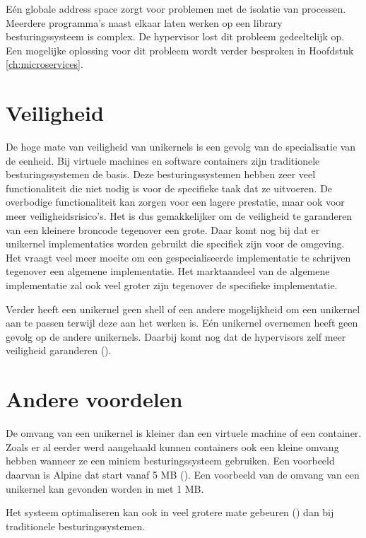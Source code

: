 Eén globale address space zorgt voor problemen met de isolatie van processen. Meerdere programma's naast elkaar laten werken op een library besturingssysteem is complex. De hypervisor lost dit probleem gedeeltelijk op. Een mogelijke oplossing voor dit probleem wordt verder besproken in Hoofdstuk \ref{ch:microservices}.

\section{Veiligheid}

De hoge mate van veiligheid van unikernels is een gevolg van de specialisatie van de eenheid. Bij virtuele machines en software containers zijn traditionele besturingssystemen de basis. Deze besturingssystemen hebben zeer veel functionaliteit die niet nodig is voor de specifieke taak dat ze uitvoeren. De overbodige functionaliteit kan zorgen voor een lagere prestatie, maar ook voor meer veiligheidsrisico's. Het is dus gemakkelijker om de veiligheid te garanderen van een kleinere broncode tegenover een grote. Daar komt nog bij dat er unikernel implementaties worden gebruikt die specifiek zijn voor de omgeving. Het vraagt veel meer moeite om een gespecialiseerde implementatie te schrijven tegenover een algemene implementatie. Het marktaandeel van de algemene implementatie zal ook veel groter zijn tegenover de specifieke implementatie.

Verder heeft een unikernel geen shell of een andere mogelijkheid om een unikernel aan te passen terwijl deze aan het werken is. Eén unikernel overnemen heeft geen gevolg op de andere unikernels. Daarbij komt nog dat de hypervisors zelf meer veiligheid garanderen (\cite{colp_breaking_2011}).

\section{Andere voordelen}
\label{sec:bene_unikernels}

De omvang van een unikernel is kleiner dan een virtuele machine of een container. Zoals er al eerder werd aangehaald kunnen containers ook een kleine omvang hebben wanneer ze een miniem besturingssysteem gebruiken. Een voorbeeld daarvan is Alpine dat start vanaf 5 MB (\cite{_gliderlabs/docker-alpine_????}).
Een voorbeeld van de omvang van een unikernel kan gevonden worden in \cite[hoofdstuk 4, p.~10]{madhavapeddy_jitsu:_2015} met 1 MB.

Het systeem optimaliseren kan ook in veel grotere mate gebeuren (\cite{madhavapeddy_turning_2010}) dan bij traditionele besturingssystemen.

